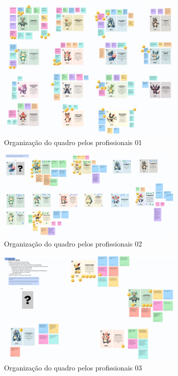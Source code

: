 \documentclass[
	12pt,
	openright,
	twoside,
	a4paper,
	english,
	brazil
	]{abntex2}
\begin{document}
\begin{figure}[H]
  \centering
	\caption{\label{bridge-print-quadro-1} Organização do quadro pelos profissionais 01}
  \includegraphics[width=0.8\textwidth]{bridge-print-quadro-1}
\end{figure}

\begin{figure}[H]
  \centering
	\caption{\label{bridge-print-quadro-2} Organização do quadro pelos profissionais 02}
  \includegraphics[width=0.8\textwidth]{bridge-print-quadro-2}
\end{figure}

\begin{figure}[H]
  \centering
	\caption{\label{bridge-print-quadro-3} Organização do quadro pelos profissionais 03}
  \includegraphics[width=0.8\textwidth]{bridge-print-quadro-3}
\end{figure}
\end{document}

